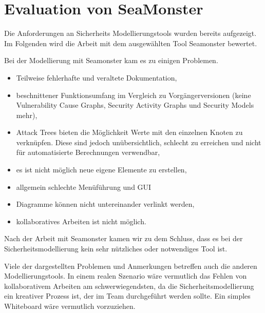 \section{Evaluation von SeaMonster}
Die Anforderungen an Sicherheits Modellierungstools wurden bereits aufgezeigt. Im Folgenden wird die Arbeit mit dem ausgewählten Tool Seamonster bewertet.

Bei der Modellierung mit Seamonster kam es zu einigen Problemen.
\begin{itemize}
\item Teilweise fehlerhafte und veraltete Dokumentation,
\item beschnittener Funktionsumfang im Vergleich zu Vorgängerversionen (keine Vulnerability Cause Graphs, Security Activity Graphs und Security Models mehr),
\item Attack Trees bieten die Möglichkeit Werte mit den einzelnen Knoten zu verknüpfen. Diese sind jedoch unübersichtlich, schlecht zu erreichen und nicht für automatisierte Berechnungen verwendbar,
\item es ist nicht möglich neue eigene Elemente zu erstellen,
\item allgemein schlechte Menüführung und GUI
\item Diagramme können nicht untereinander verlinkt werden,
\item kollaboratives Arbeiten ist nicht möglich.
\end{itemize}

Nach der Arbeit mit Seamonster kamen wir zu dem Schluss, dass es bei der Sicherheitsmodellierung kein sehr nützliches oder notwendiges Tool ist.

Viele der dargestellten Problemen und Anmerkungen betreffen auch die anderen Modellierungstools. In einem realen Szenario wäre vermutlich das Fehlen von kollaborativem Arbeiten am schwerwiegendsten, da die Sicherheitsmodellierung ein kreativer Prozess ist, der im Team durchgeführt werden sollte. Ein simples Whiteboard wäre vermutlich vorzuziehen.